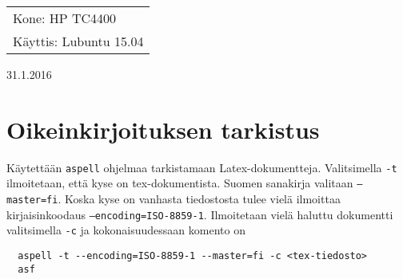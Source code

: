 \documentclass[main.tex]{subfiles}
\begin{document}
\thispagestyle{empty}
\begin{tabular}[t]{l}
Kone: HP TC4400\\
Käyttis: Lubuntu 15.04
\end{tabular}
\hfill 31.1.2016

{\section{Oikeinkirjoituksen tarkistus}}

Käytettään \texttt{aspell} ohjelmaa tarkistamaan Latex-dokumentteja. Valitsimella \texttt{-t} ilmoitetaan, että kyse on tex-dokumentista. Suomen sanakirja valitaan \texttt{--master=fi}. Koska kyse on vanhasta tiedostosta tulee vielä ilmoittaa kirjaisinkoodaus \texttt{--encoding=ISO-8859-1}. Ilmoitetaan vielä haluttu dokumentti valitsimella \texttt{-c} ja kokonaisuudessaan komento on

\begin{lstlisting}
  aspell -t --encoding=ISO-8859-1 --master=fi -c <tex-tiedosto>
  asf
\end{lstlisting}
\end{document}
